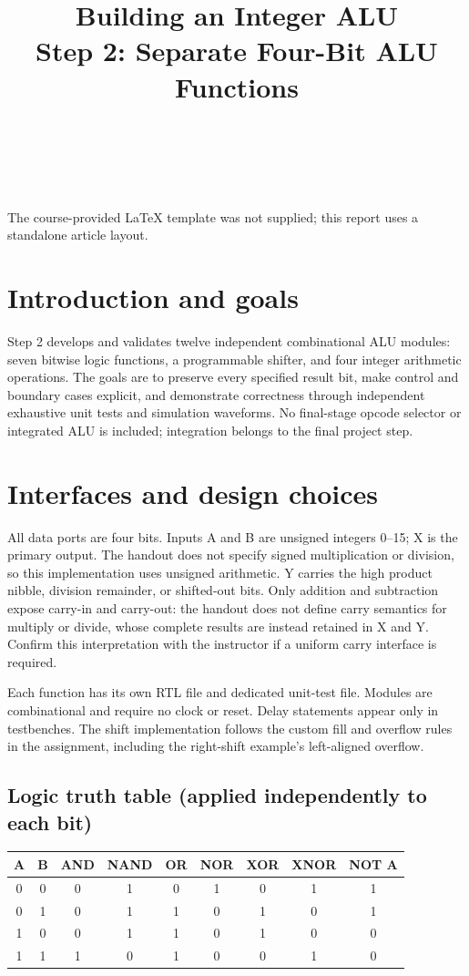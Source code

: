 \documentclass[11pt]{article}
\title{Building an Integer ALU\\Step 2: Separate Four-Bit ALU Functions}
\author{\groupname\\\members\\\course}
\date{\reportdate}
\begin{document}
\maketitle
\noindent The course-provided LaTeX template was not supplied; this report uses a standalone article layout.
\tableofcontents
\newpage
\section{Introduction and goals}
Step 2 develops and validates twelve independent combinational ALU modules: seven bitwise logic functions, a programmable shifter, and four integer arithmetic operations. The goals are to preserve every specified result bit, make control and boundary cases explicit, and demonstrate correctness through independent exhaustive unit tests and simulation waveforms. No final-stage opcode selector or integrated ALU is included; integration belongs to the final project step.

\section{Interfaces and design choices}
All data ports are four bits. Inputs A and B are unsigned integers 0--15; X is the primary output. The handout does not specify signed multiplication or division, so this implementation uses unsigned arithmetic. Y carries the high product nibble, division remainder, or shifted-out bits. Only addition and subtraction expose carry-in and carry-out: the handout does not define carry semantics for multiply or divide, whose complete results are instead retained in X and Y. Confirm this interpretation with the instructor if a uniform carry interface is required.

Each function has its own RTL file and dedicated unit-test file. Modules are combinational and require no clock or reset. Delay statements appear only in testbenches. The shift implementation follows the custom fill and overflow rules in the assignment, including the right-shift example's left-aligned overflow.

\subsection{Logic truth table (applied independently to each bit)}
\begin{center}
\begin{tabular}{cc|ccccccc}
A&B&AND&NAND&OR&NOR&XOR&XNOR&NOT A\\\hline
0&0&0&1&0&1&0&1&1\\
0&1&0&1&1&0&1&0&1\\
1&0&0&1&1&0&1&0&0\\
1&1&1&0&1&0&0&1&0
\end{tabular}
\end{center}
\end{document}
